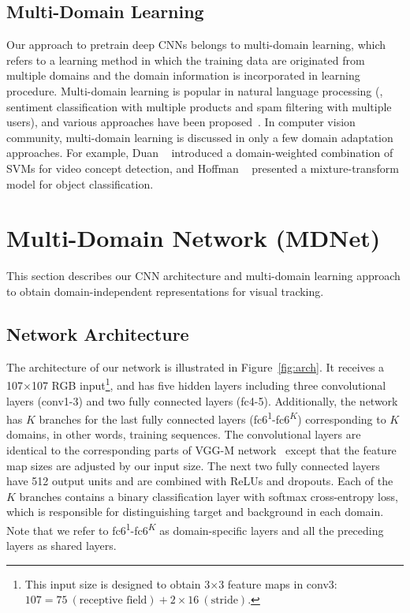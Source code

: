 \documentclass[10pt,twocolumn,letterpaper]{article}
\begin{document}
\subsection{Multi-Domain Learning}
\label{sub:multi-domain}
Our approach to pretrain deep CNNs belongs to multi-domain learning, which refers to a learning method in which the training data are originated from multiple domains and the domain information is incorporated in learning procedure. 
Multi-domain learning is popular in natural language processing (\eg, sentiment classification with multiple products and spam filtering with multiple users), and various approaches have been proposed~\cite{daume2009frustratingly,dredze2010multi,joshi2012multi}. 
In computer vision community, multi-domain learning is discussed in only a few domain adaptation approaches. 
For example, Duan \etal~\cite{duan2009domain} introduced a domain-weighted combination of SVMs for video concept detection, and Hoffman \etal~\cite{hoffman2012discovering} presented a mixture-transform model for object classification. 


\section{Multi-Domain Network (MDNet)}
\label{sec:multi-domain}
This section describes our CNN architecture and multi-domain learning approach to obtain domain-independent representations for visual tracking.

\subsection{Network Architecture}
The architecture of our network is illustrated in Figure~\ref{fig:arch}.
It receives a 107$\times$107 RGB input\footnote{This input size is designed to obtain 3$\times$3 feature maps in conv3: $107= 75~(\text{receptive field}) + 2\times16~(\text{stride})$.}, and has five hidden layers including three convolutional layers (conv1-3) and two fully connected layers (fc4-5).
Additionally, the network has $K$ branches for the last fully connected layers (fc6\textsuperscript{1}-fc6\textsuperscript{$K$}) corresponding to $K$ domains, in other words, training sequences.
The convolutional layers are identical to the corresponding parts of VGG-M network~\cite{chatfield2014return} except that the feature map sizes are adjusted by our input size.
The next two fully connected layers have 512 output units and are combined with ReLUs and dropouts.
Each of the $K$ branches contains a binary classification layer with softmax cross-entropy loss, which is responsible for distinguishing target and background in each domain.
Note that we refer to fc6\textsuperscript{1}-fc6\textsuperscript{$K$} as domain-specific layers and all the preceding layers as shared layers.
\end{document}
